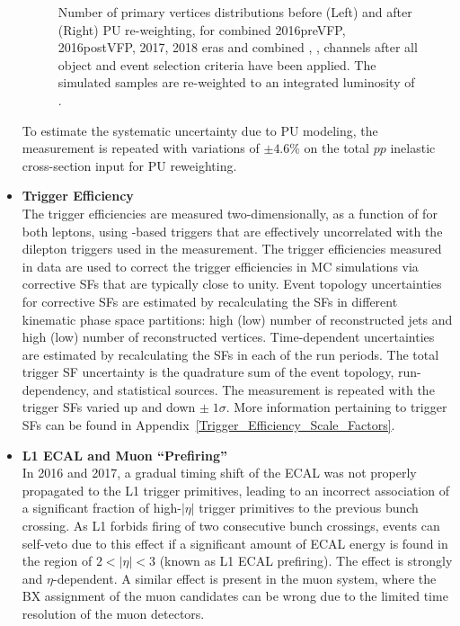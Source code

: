 \begin{refsection}
\begin{itemize}
\begin{figure}[htb]
\begin{center}
\begin{tabular}{cc}
        \end{tabular}
        \caption{\footnotesize Number of primary vertices distributions before (Left) and after (Right) PU re-weighting, for combined 2016preVFP, 2016postVFP, 2017, 2018 eras and combined \ee, \emu, \mumu channels after all object and event selection criteria have been applied.
        The simulated samples are re-weighted to an integrated luminosity of \lumivalueRuniiUL.
        \label{PU_re-weighting}
        }
    \end{center}
\end{figure}
    To estimate the systematic uncertainty due to PU modeling, the measurement is repeated with variations of $\pm 4.6\%$ on the total $pp$ inelastic cross-section input for PU reweighting.
    \item {\bf Trigger Efficiency} \\
    The trigger efficiencies are measured two-dimensionally, as a function of \pT for both leptons, using \ETmiss-based triggers that are effectively uncorrelated with the dilepton triggers used in the measurement. 
    The trigger efficiencies measured in data are used to correct the trigger efficiencies in MC simulations via corrective SFs that are typically close to unity. 
    Event topology uncertainties for corrective SFs are estimated by recalculating the SFs in different kinematic phase space partitions: high (low) number of reconstructed jets and high (low) number of reconstructed vertices.
    Time-dependent uncertainties are estimated by recalculating the SFs in each of the run periods.
    The total trigger SF uncertainty is the quadrature sum of the event topology, run-dependency, and statistical sources.
    The measurement is repeated with the trigger SFs varied up and down $\pm \; 1 \sigma$.
    More information pertaining to trigger SFs can be found in Appendix~\ref{Trigger_Efficiency_Scale_Factors}.
    \item {\bf L1 ECAL and Muon ``Prefiring''} \\
    In 2016 and 2017, a gradual timing shift of the ECAL was not properly propagated to the L1 trigger primitives, leading to an incorrect association of a significant fraction of high-$\vert \eta \vert$ trigger primitives to the previous bunch crossing.
    As L1 forbids firing of two consecutive bunch crossings, events can self-veto due to this effect if a significant amount of ECAL energy is found in the region of $2<\vert \eta \vert<3$ (known as L1 ECAL prefiring).
    The effect is strongly \pT and $\eta$-dependent.
    A similar effect is present in the muon system, where the BX assignment of the muon candidates can be wrong due to the limited time resolution of the muon detectors. 

\end{itemize}
\end{refsection}
